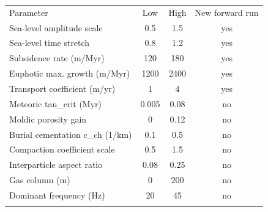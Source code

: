 \begin{tabular}{lccc}
\tophline
Parameter & Low & High & New forward run \\
\middlehline
Sea-level amplitude scale & 0.5 & 1.5 & yes \\
Sea-level time stretch & 0.8 & 1.2 & yes \\
Subsidence rate (m/Myr) & 120 & 180 & yes \\
Euphotic max. growth (m/Myr) & 1200 & 2400 & yes \\
Transport coefficient (m/yr) & 1 & 4 & yes \\
Meteoric tau\_crit (Myr) & 0.005 & 0.08 & no \\
Moldic porosity gain & 0 & 0.12 & no \\
Burial cementation c\_ch (1/km) & 0.1 & 0.5 & no \\
Compaction coefficient scale & 0.5 & 1.5 & no \\
Interparticle aspect ratio & 0.08 & 0.25 & no \\
Gas column (m) & 0 & 200 & no \\
Dominant frequency (Hz) & 20 & 45 & no \\
\bottomhline
\end{tabular}
